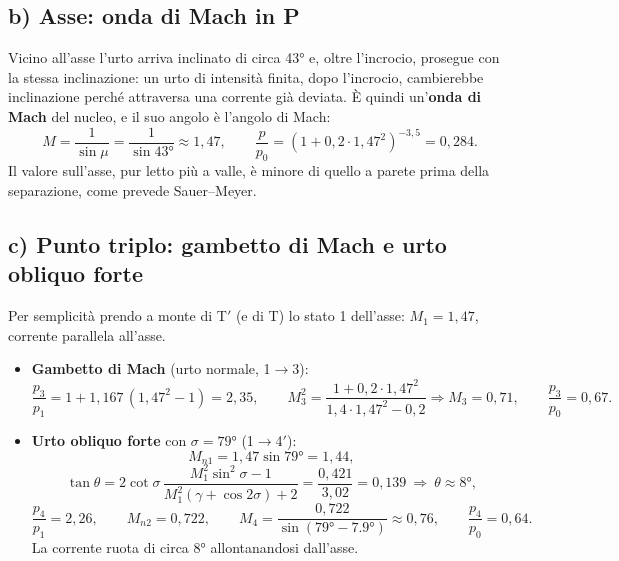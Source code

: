\documentclass[11pt,a4paper]{article}
\begin{document}
\subsection*{b) Asse: onda di Mach in P}
Vicino all'asse l'urto arriva inclinato di circa \ang{43} e, oltre l'incrocio, prosegue con la stessa inclinazione:
un urto di intensità finita, dopo l'incrocio, cambierebbe inclinazione perché attraversa una corrente già deviata. È
quindi un'\textbf{onda di Mach} del nucleo, e il suo angolo è l'angolo di Mach:
\[
M=\frac{1}{\sin\mu}=\frac{1}{\sin\ang{43}}\approx1{,}47,\qquad \frac{p}{p_0}=(1+0{,}2\cdot1{,}47^2)^{-3{,}5}=0{,}284 .
\]
Il valore sull'asse, pur letto più a valle, è minore di quello a parete prima della separazione, come prevede
Sauer--Meyer.

\subsection*{c) Punto triplo: gambetto di Mach e urto obliquo forte}
Per semplicità prendo a monte di T$'$ (e di T) lo stato 1 dell'asse: $M_1=1{,}47$, corrente parallela all'asse.
\begin{itemize}
\item \textbf{Gambetto di Mach} (urto normale, 1$\to$3):
\[
\frac{p_3}{p_1}=1+1{,}167\,(1{,}47^2-1)=2{,}35,\qquad M_3^2=\frac{1+0{,}2\cdot1{,}47^2}{1{,}4\cdot1{,}47^2-0{,}2}
\Rightarrow M_3=0{,}71,\qquad \frac{p_3}{p_0}=0{,}67 .
\]
\item \textbf{Urto obliquo forte} con $\sigma=\ang{79}$ (1$\to$4$'$):
\[
M_{n1}=1{,}47\sin\ang{79}=1{,}44,
\]
\[
\tan\theta=2\cot\sigma\,\frac{M_1^2\sin^2\sigma-1}{M_1^2(\gamma+\cos2\sigma)+2}=\frac{0{,}421}{3{,}02}=0{,}139
\ \Rightarrow\ \theta\approx\ang{8},
\]
\[
\frac{p_4}{p_1}=2{,}26,\qquad M_{n2}=0{,}722,\qquad M_4=\frac{0{,}722}{\sin(\ang{79}-\ang{7.9})}\approx0{,}76,\qquad
\frac{p_4}{p_0}=0{,}64 .
\]
La corrente ruota di circa \ang{8} allontanandosi dall'asse.
\end{itemize}

\end{document}
